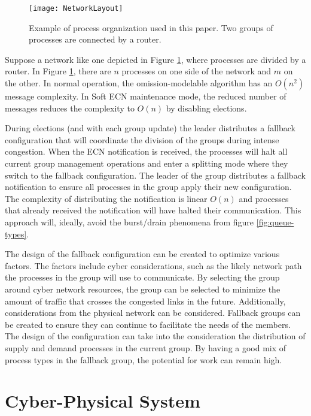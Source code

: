 \begin{figure}
\centering
\texttt{[image: NetworkLayout]}
\caption{Example of process organization used in this paper. Two groups of processes are connected by a router.} \label{fig:network-layout}
\end{figure}

Suppose a network like one depicted in Figure \ref{fig:network-layout}, where processes are divided by a router.
In Figure \ref{fig:network-layout}, there are $n$ processes on one side of the network and $m$ on the other.
In normal operation, the omission-modelable algorithm has an $O(n^2)$ message complexity.
In Soft \ac{ECN} maintenance mode, the reduced number of messages reduces the complexity to $O(n)$ by disabling elections.

During elections (and with each group update) the leader distributes a fallback configuration that will coordinate the division of the groups during intense congestion.
When the \ac{ECN} notification is received, the processes will halt all current group management operations and enter a splitting mode where they switch to the fallback configuration.
The leader of the group distributes a fallback notification to ensure all processes in the group apply their new configuration. 
The complexity of distributing the notification is linear $O(n)$ and processes that already received the notification will have halted their communication.
This approach will, ideally, avoid the burst/drain phenomena from figure \ref{fig:queue-types}.

The design of the fallback configuration can be created to optimize various factors.
The factors include cyber considerations, such as the likely network path the processes in the group will use to communicate.
By selecting the group around cyber network resources, the group can be selected to minimize the amount of traffic that crosses the congested links in the future.
Additionally, considerations from the physical network can be considered.
Fallback groups can be created to ensure they can continue to facilitate the needs of the members.
The design of the configuration can take into the consideration the distribution of supply and demand processes in the current group.
By having a good mix of process types in the fallback group, the potential for work can remain high.

\section{Cyber-Physical System}

